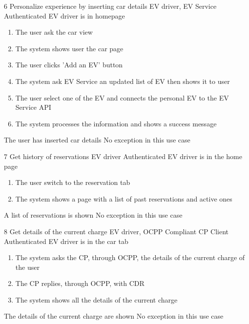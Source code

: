\usecase
{6}
{Personalize experience by inserting car details}
{EV driver, EV Service}
{Authenticated EV driver is in homepage}
{
    \begin{enumerate}
        \item The user ask the car view
        \item The system shows user the car page
        \item The user clicks 'Add an EV' button
        \item The system ask EV Service an updated list of EV then shows it to user
        \item The user select one of the EV and connects the personal EV to the EV Service API
        \item The system processes the information and shows a success message
    \end{enumerate}
}
{The user has inserted car details}
{
    No exception in this use case
}
{
}

\usecase
{7}
{Get history of reservations}
{EV driver}
{Authenticated EV driver is in the home page}
{
    \begin{enumerate}
        \item The user switch to the reservation tab
        \item The system shows a page with a list of past reservations and active ones
    \end{enumerate}
}
{A list of reservations is shown}
{
    No exception in this use case
}
{
}

\usecase
{8}
{Get details of the current charge}
{EV driver, OCPP Compliant CP Client}
{Authenticated EV driver is in the car tab}
{
    \begin{enumerate}
        \item The system asks the CP, through OCPP, the details of the current charge of the user
        \item The CP replies, through OCPP, with CDR
        \item The system shows all the details of the current charge
    \end{enumerate}
}
{The details of the current charge are shown}
{
    No exception in this use case
}
{
}

